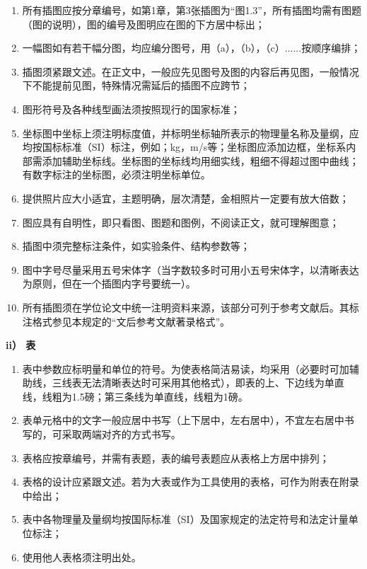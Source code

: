 \begin{enumerate}[1)]
    \item 所有插图应按分章编号，如第1章，第3张插图为“图1.3”，所有插图均需有图题（图的说明），图的编号及图明应在图的下方居中标出；
    \item 一幅图如有若干幅分图，均应编分图号，用（a），（b），（c）......按顺序编排；
    \item 插图须紧跟文述。在正文中，一般应先见图号及图的内容后再见图，一般情况下不能提前见图，特殊情况需延后的插图不应跨节；
    \item 图形符号及各种线型画法须按照现行的国家标准；
    \item 坐标图中坐标上须注明标度值，并标明坐标轴所表示的物理量名称及量纲，应均按国标标准（SI）标注，例如；kg，m/s等；坐标图应添加边框，坐标系内部需添加辅助坐标线。坐标图的坐标线均用细实线，粗细不得超过图中曲线；有数字标注的坐标图，必须注明坐标单位。
    \item 提供照片应大小适宜，主题明确，层次清楚，金相照片一定要有放大倍数；
    \item 图应具有自明性，即只看图、图题和图例，不阅读正文，就可理解图意；
    \item 插图中须完整标注条件，如实验条件、结构参数等；
    \item 图中字号尽量采用五号宋体字（当字数较多时可用小五号宋体字，以清晰表达为原则，但在一个插图内字号要统一）。
    \item 所有插图须在学位论文中统一注明资料来源，该部分可列于参考文献后。其标注格式参见本规定的“文后参考文献著录格式”。
\end{enumerate}

{\bf ii） 表}

\begin{enumerate}[1)]%
    \item 表中参数应标明量和单位的符号。为使表格简洁易读，均采用（必要时可加辅助线，三线表无法清晰表达时可采用其他格式），即表的上、下边线为单直线，线粗为1.5磅；第三条线为单直线，线粗为1磅。
    \item 表单元格中的文字一般应居中书写（上下居中，左右居中），不宜左右居中书写的，可采取两端对齐的方式书写。
    \item 表格应按章编号，并需有表题，表的编号表题应从表格上方居中排列；
    \item 表格的设计应紧跟文述。若为大表或作为工具使用的表格，可作为附表在附录中给出；
    \item 表中各物理量及量纲均按国际标准（SI）及国家规定的法定符号和法定计量单位标注；
    \item 使用他人表格须注明出处。
\end{enumerate}


